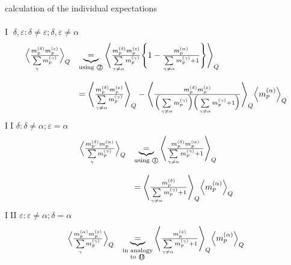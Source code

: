 \documentclass[a4paper,11pt]{article}
\begin{document}
\newpage
\noindent calculation of the individual expectations\\\\
\textcircled{I} $\delta, \varepsilon: \delta \neq \varepsilon; \delta, \varepsilon \neq \alpha$
\begin{equation}
	\begin{array}{ll}
	\Big< \frac{m_p^{(\delta)} m_p^{(\epsilon)}}{\sum\limits_\gamma
			m_p^{(\gamma)}} \Big>_Q
	& \underbrace{=}_{\text{using \textcircled{2}}} 
		\Bigg< \frac{m_p^{(\delta)} m_p^{(\varepsilon)}}{
				\sum\limits_{\gamma \neq \alpha}
				m_p^{(\gamma)}}
			\Bigg\{ 1 - \frac{m_p^{(\alpha)}}{
				\sum\limits_{\gamma \neq \alpha}
				m_p^{(\gamma)} + 1}
			\Bigg\}
		\Bigg>_Q \\\\
	& = \Bigg< \frac{m_p^{(\delta)} m_p^{(\varepsilon)}}{
				\sum\limits_{\gamma \neq \alpha}
				m_p^{(\gamma)}}
	\Bigg>_Q - \Bigg< \frac{m_p^{(\delta)} m_p^{(\varepsilon)}}{
		\Big(\sum\limits_{\gamma \neq \alpha} m_p^{(\gamma)} \Big)
		\Big(\sum\limits_{\gamma \neq \alpha} m_p^{(\gamma)} + 1 \Big)}
	\Bigg>_Q \Big< m_p^{(\alpha)} \Big>_Q
	\end{array}
\end{equation}
\textcircled{II} $\delta: \delta \neq \alpha; \varepsilon = \alpha$
\begin{equation}
	\begin{array}{ll}
	\Big< \frac{m_p^{(\delta)} m_p^{(\alpha)}}{\sum\limits_\gamma
			m_p^{(\gamma)}} \Big>_Q
	& \underbrace{=}_{\text{using \textcircled{1}}}
		\Bigg< \frac{m_p^{(\delta)} m_p^{(\alpha)}}{
			\sum\limits_{\gamma \neq \alpha}
			m_p^{(\gamma)} + 1}
		\Bigg>_Q \\\\
	& = \Bigg< \frac{m_p^{(\delta)}}{\sum\limits_{\gamma \neq \alpha}
			m_p^{(\gamma)} + 1}
	\Bigg>_Q \Big< m_p^{(\alpha)} \Big>_Q
	\end{array}
\end{equation}
\textcircled{III} $\varepsilon: \varepsilon \neq \alpha; \delta = \alpha$
\begin{equation}
	\begin{array}{ll}
	\Big< \frac{m_p^{(\alpha)} m_p^{(\varepsilon)}}{\sum\limits_\gamma
			m_p^{(\gamma)}} \Big>_Q
	& \underbrace{=}_{\substack{ \text{in analogy} \\ 
					\text{to \textcircled{II}}}}
		\Bigg< \frac{m_p^{(\varepsilon)}}{
				\sum\limits_{\gamma \neq \alpha}
				m_p^{(\gamma)} + 1}
		\Bigg>_Q \Big< m_p^{(\alpha)} \Big>_Q
	\end{array}
\end{equation}
\end{document}
